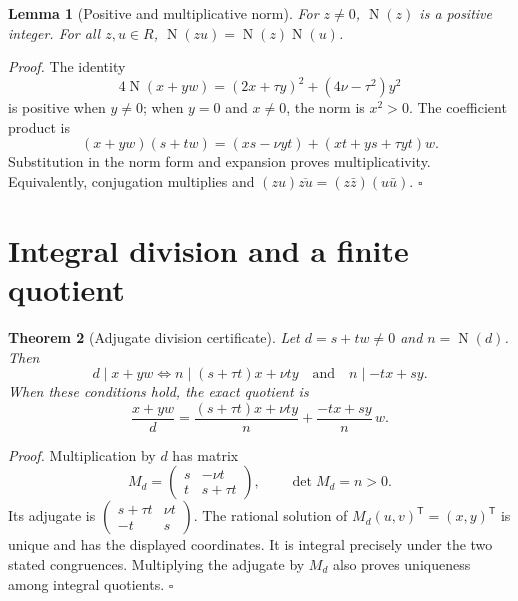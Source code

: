 \documentclass[11pt,letterpaper]{article}
\newtheorem{theorem}{Theorem}
\newtheorem{lemma}[theorem]{Lemma}
\newenvironment{proof}{\noindent\textit{Proof.}}{\hfill\(\square\)}
\newcommand{\OrderNorm}{\operatorname{N}}
\begin{document}
\begin{lemma}[Positive and multiplicative norm]
For \(z\ne0\), \(\OrderNorm(z)\) is a positive integer. For all \(z,u\in R\),
\(\OrderNorm(zu)=\OrderNorm(z)\OrderNorm(u)\).
\end{lemma}
\begin{proof}
The identity
\[
4\OrderNorm(x+yw)=(2x+\tau y)^2+(4\nu-\tau^2)y^2
\]
is positive when \(y\ne0\); when \(y=0\) and \(x\ne0\), the norm is \(x^2>0\).
The coefficient product is
\[
(x+yw)(s+tw)=(xs-\nu yt)+(xt+ys+\tau yt)w.
\]
Substitution in the norm form and expansion proves multiplicativity.
Equivalently, conjugation multiplies and
\((zu)\overline{zu}=(z\bar z)(u\bar u)\).
\end{proof}

\section{Integral division and a finite quotient}

\begin{theorem}[Adjugate division certificate]
Let \(d=s+tw\ne0\) and \(n=\OrderNorm(d)\). Then
\[
d\mid x+yw
\iff
n\mid (s+\tau t)x+\nu ty
\quad\text{and}\quad
n\mid -tx+sy.
\]
When these conditions hold, the exact quotient is
\[
\frac{x+yw}{d}
=\frac{(s+\tau t)x+\nu ty}{n}
+\frac{-tx+sy}{n}\,w.
\]
\end{theorem}
\begin{proof}
Multiplication by \(d\) has matrix
\[
M_d=\begin{pmatrix}s&-\nu t\\t&s+\tau t\end{pmatrix},
\qquad
\det M_d=n>0.
\]
Its adjugate is
\(\left(\begin{smallmatrix}s+\tau t&\nu t\\-t&s\end{smallmatrix}\right)\).
The rational solution of \(M_d(u,v)^{\mathsf T}=(x,y)^{\mathsf T}\) is
unique and has the displayed coordinates. It is integral precisely
under the two stated congruences. Multiplying the adjugate by \(M_d\)
also proves uniqueness among integral quotients.
\end{proof}
\end{document}

